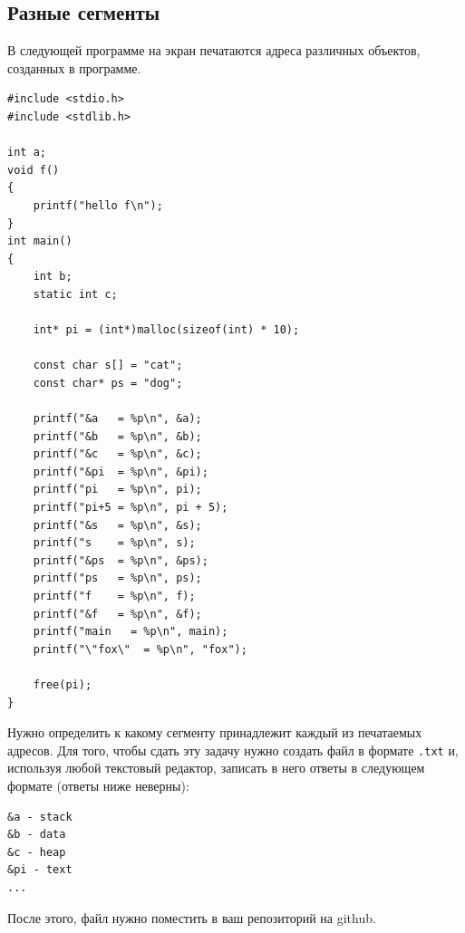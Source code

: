 \documentclass[10pt]{article}
\begin{document}
\subsection{Разные сегменты}
В следующей программе на экран печатаются адреса различных объектов, созданных в программе.
\begin{lstlisting}
#include <stdio.h>
#include <stdlib.h>

int a;
void f() 
{
    printf("hello f\n");
}
int main()
{
    int b;
    static int c; 
       
    int* pi = (int*)malloc(sizeof(int) * 10);
    
    const char s[] = "cat";
    const char* ps = "dog";
    
    printf("&a   = %p\n", &a);
    printf("&b   = %p\n", &b);
    printf("&c   = %p\n", &c);
    printf("&pi  = %p\n", &pi);
    printf("pi   = %p\n", pi);
    printf("pi+5 = %p\n", pi + 5);
    printf("&s   = %p\n", &s);
    printf("s    = %p\n", s);
    printf("&ps  = %p\n", &ps);
    printf("ps   = %p\n", ps);
    printf("f    = %p\n", f);
    printf("&f   = %p\n", &f);
    printf("main   = %p\n", main);
    printf("\"fox\"  = %p\n", "fox");
    
    free(pi);
}
\end{lstlisting}
Нужно определить к какому сегменту принадлежит каждый из печатаемых адресов.
Для того, чтобы сдать эту задачу нужно создать файл в формате \texttt{.txt} и, используя любой текстовый редактор, записать в него ответы в следующем формате (ответы ниже неверны):
\begin{verbatim}
&a - stack
&b - data
&c - heap
&pi - text
...
\end{verbatim} 
После этого, файл нужно поместить в ваш репозиторий на github.
\end{document}
